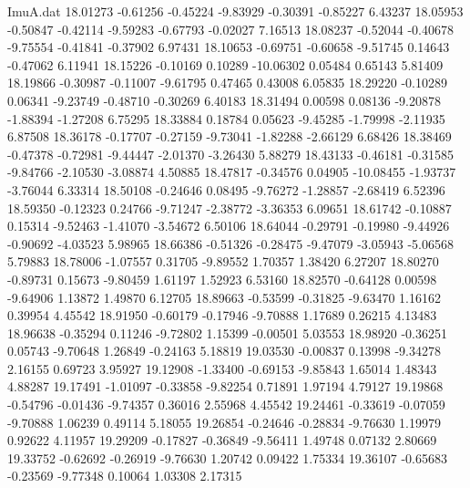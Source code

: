 \begin{filecontents}{ImuA.dat}
  18.01273   -0.61256   -0.45224   -9.83929   -0.30391   -0.85227    6.43237
  18.05953   -0.50847   -0.42114   -9.59283   -0.67793   -0.02027    7.16513
  18.08237   -0.52044   -0.40678   -9.75554   -0.41841   -0.37902    6.97431
  18.10653   -0.69751   -0.60658   -9.51745    0.14643   -0.47062    6.11941
  18.15226   -0.10169    0.10289  -10.06302    0.05484    0.65143    5.81409
  18.19866   -0.30987   -0.11007   -9.61795    0.47465    0.43008    6.05835
  18.29220   -0.10289    0.06341   -9.23749   -0.48710   -0.30269    6.40183
  18.31494    0.00598    0.08136   -9.20878   -1.88394   -1.27208    6.75295
  18.33884    0.18784    0.05623   -9.45285   -1.79998   -2.11935    6.87508
  18.36178   -0.17707   -0.27159   -9.73041   -1.82288   -2.66129    6.68426
  18.38469   -0.47378   -0.72981   -9.44447   -2.01370   -3.26430    5.88279
  18.43133   -0.46181   -0.31585   -9.84766   -2.10530   -3.08874    4.50885
  18.47817   -0.34576    0.04905  -10.08455   -1.93737   -3.76044    6.33314
  18.50108   -0.24646    0.08495   -9.76272   -1.28857   -2.68419    6.52396
  18.59350   -0.12323    0.24766   -9.71247   -2.38772   -3.36353    6.09651
  18.61742   -0.10887    0.15314   -9.52463   -1.41070   -3.54672    6.50106
  18.64044   -0.29791   -0.19980   -9.44926   -0.90692   -4.03523    5.98965
  18.66386   -0.51326   -0.28475   -9.47079   -3.05943   -5.06568    5.79883
  18.78006   -1.07557    0.31705   -9.89552    1.70357    1.38420    6.27207
  18.80270   -0.89731    0.15673   -9.80459    1.61197    1.52923    6.53160
  18.82570   -0.64128    0.00598   -9.64906    1.13872    1.49870    6.12705
  18.89663   -0.53599   -0.31825   -9.63470    1.16162    0.39954    4.45542
  18.91950   -0.60179   -0.17946   -9.70888    1.17689    0.26215    4.13483
  18.96638   -0.35294    0.11246   -9.72802    1.15399   -0.00501    5.03553
  18.98920   -0.36251    0.05743   -9.70648    1.26849   -0.24163    5.18819
  19.03530   -0.00837    0.13998   -9.34278    2.16155    0.69723    3.95927
  19.12908   -1.33400   -0.69153   -9.85843    1.65014    1.48343    4.88287
  19.17491   -1.01097   -0.33858   -9.82254    0.71891    1.97194    4.79127
  19.19868   -0.54796   -0.01436   -9.74357    0.36016    2.55968    4.45542
  19.24461   -0.33619   -0.07059   -9.70888    1.06239    0.49114    5.18055
  19.26854   -0.24646   -0.28834   -9.76630    1.19979    0.92622    4.11957
  19.29209   -0.17827   -0.36849   -9.56411    1.49748    0.07132    2.80669
  19.33752   -0.62692   -0.26919   -9.76630    1.20742    0.09422    1.75334
  19.36107   -0.65683   -0.23569   -9.77348    0.10064    1.03308    2.17315

\end{filecontents}

